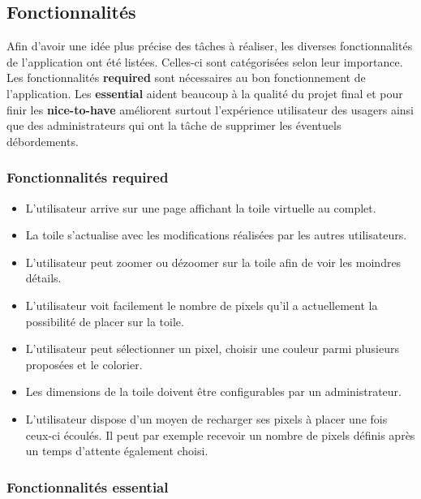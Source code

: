 \subsection{Fonctionnalités}

Afin d'avoir une idée plus précise des tâches à réaliser, les diverses fonctionnalités de l'application ont été listées. Celles-ci sont catégorisées selon leur importance. Les fonctionnalités \textbf{required} sont nécessaires au bon fonctionnement de l'application. Les \textbf{essential} aident beaucoup à la qualité du projet final et pour finir les \textbf{nice-to-have} améliorent surtout l'expérience utilisateur des usagers ainsi que des administrateurs qui ont la tâche de supprimer les éventuels débordements.

\subsubsection{Fonctionnalités \guillemotleft required\guillemotright}

\begin{itemize}
  \item L'utilisateur arrive sur une page affichant la toile virtuelle au complet.
  \item La toile s'actualise avec les modifications réalisées par les autres utilisateurs.
  \item L'utilisateur peut zoomer ou dézoomer sur la toile afin de voir les moindres détails.
  \item L'utilisateur voit facilement le nombre de pixels qu'il a actuellement la possibilité de placer sur la toile.
  \item L'utilisateur peut sélectionner un pixel, choisir une couleur parmi plusieurs proposées et le colorier.
  \item Les dimensions de la toile doivent être configurables par un administrateur.
  \item L'utilisateur dispose d'un moyen de recharger ses pixels à placer une fois ceux-ci écoulés. Il peut par exemple recevoir un nombre de pixels définis après un temps d'attente également choisi.
\end{itemize}

\subsubsection{Fonctionnalités \guillemotleft essential\guillemotright}

